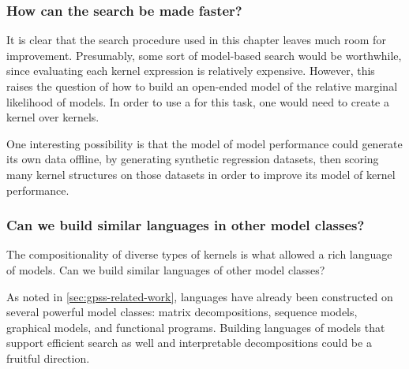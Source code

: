 \subsubsection{How can the search be made faster?}
It is clear that the search procedure used in this chapter leaves much room for improvement.
Presumably, some sort of model-based search would be worthwhile, since evaluating each kernel expression is relatively expensive.
However, this raises the question of how to build an open-ended model of the relative marginal likelihood of \gp{} models.
In order to use a \gp{} for this task, one would need to create a kernel over kernels.

One interesting possibility is that the model of model performance could generate its own data offline, by generating synthetic regression datasets, then scoring many kernel structures on those datasets in order to improve its model of kernel performance.

\subsubsection{Can we build similar languages in other model classes?}
The compositionality of diverse types of kernels is what allowed a rich language of \gp{} models.
Can we build similar languages of other model classes?

As noted in \cref{sec:gpss-related-work}, languages have already been constructed on several powerful model classes: matrix decompositions, sequence models, graphical models, and functional programs.
Building languages of models that support efficient search as well and interpretable decompositions could be a fruitful direction.


\outbpdocument{


}





\iffalse


